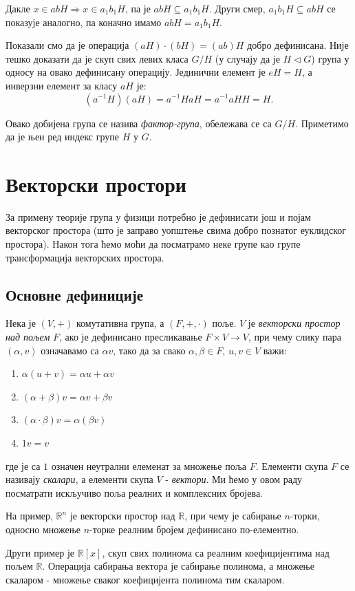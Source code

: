 \documentclass{report}
\theoremstyle{plain}
\theoremstyle{definition}
\begin{document}
Дакле $x\in abH \Rightarrow x\in a_1b_1H$, па  је $abH \subseteq a_1b_1H$. Други смер, $a_1 b_1 H \subseteq abH$ се показује аналогно, па коначно имамо $abH = a_1b_1H$.

Показали смо да је операција $(aH)\cdot (bH) = (ab)H$ добро дефинисана. Није тешко доказати да је скуп свих левих класа $G/H$ (у случају да је $H\lhd G$) група у односу на овако дефинисану операцију. Јединични елемент је $eH = H$, а инверзни елемент за класу $aH$ је:
$$(a^{-1}H)(aH) = a^{-1}HaH = a^{-1}aHH = H.$$

Овако добијена група се назива \emph{фактор-група}, обележава се са $G/H$. Приметимо да је њен ред индекс групе $H$ у $G$.

\chapter{Векторски простори}
За примену теорије група у физици потребно је дефинисати још и појам векторског простора (што је заправо уопштење свима добро познатог еуклидског простора). Након тога ћемо моћи да посматрамо неке групе као групе трансформација векторских простора.
\section{Основне дефиниције}
Нека је $(V, +)$ комутативна група, а $(F, +, \cdot)$ поље. $V$ је \emph{векторски простор над пољем} $F$, ако је дефинисано пресликавање $F\times V\to V$, при чему слику пара $(\alpha, v)$ означавамо са $\alpha v$, тако да за свако $\alpha, \beta \in F$, $u, v\in V$ важи:
\begin{enumerate}
\item $\alpha(u+v) = \alpha u+\alpha v$
\item $(\alpha + \beta)v = \alpha v+ \beta v$
\item $(\alpha\cdot\beta)v = \alpha(\beta v)$
\item $1v = v$
\end{enumerate}
где је са $1$ означен неутрални елеменат за множење поља $F$. Елементи скупа $F$ се називају \emph{скалари}, а елементи скупа $V$ - \emph{вектори}. Ми ћемо у овом раду посматрати искључиво поља реалних и комплексних бројева.

На пример, $\mathbb{R}^n$ је векторски простор над $\mathbb{R}$, при чему је сабирање $n$-торки, односно множење $n$-торке реалним бројем дефинисано по-елементно.

Други пример је $\mathbb{R}[x]$, скуп свих полинома са реалним коефицијентима над пољем $\mathbb{R}$. Операција сабирања вектора је сабирање полинома, а множење скаларом - множење сваког коефицијента полинома тим скаларом.
\end{document}

